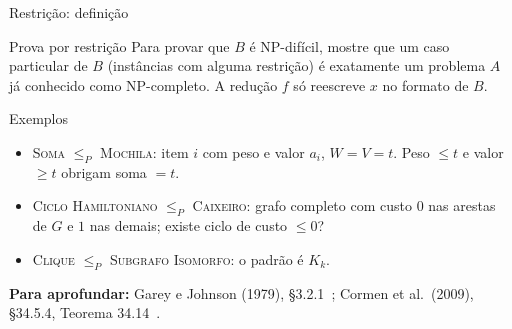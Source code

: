 \documentclass[aspectratio=169,xcolor=table]{beamer}
\newcommand{\fonte}[1]{%
  \vfill
  {\tiny\color{gray!55!black}\textbf{Para aprofundar:} #1\par}%
}
\newcommand{\prob}[1]{\textsc{#1}}
\begin{document}
\begin{frame}{Restrição: definição}
  \begin{block}{Prova por restrição}
    \small
    Para provar que $B$ é NP-difícil, mostre que um caso particular de $B$ (instâncias com
    alguma restrição) é exatamente um problema $A$ já conhecido como NP-completo. A redução
    $f$ só reescreve $x$ no formato de $B$.
  \end{block}
  \begin{exampleblock}{Exemplos}
    \scriptsize
    \begin{itemize}
      \item \prob{Soma} $\le_P$ \prob{Mochila}: item $i$ com peso e valor $a_i$, $W = V = t$.
            Peso $\le t$ e valor $\ge t$ obrigam soma $= t$.
      \item \prob{Ciclo Hamiltoniano} $\le_P$ \prob{Caixeiro}: grafo completo com custo $0$ nas
            arestas de $G$ e $1$ nas demais; existe ciclo de custo $\le 0$?
      \item \prob{Clique} $\le_P$ \prob{Subgrafo Isomorfo}: o padrão é $K_k$.
    \end{itemize}
  \end{exampleblock}
  \fonte{Garey e Johnson (1979), \S 3.2.1~\cite{garey1979computers};
    Cormen et al.\ (2009), \S 34.5.4, Teorema 34.14~\cite{cormen2009introduction}.}
\end{frame}
\end{document}
